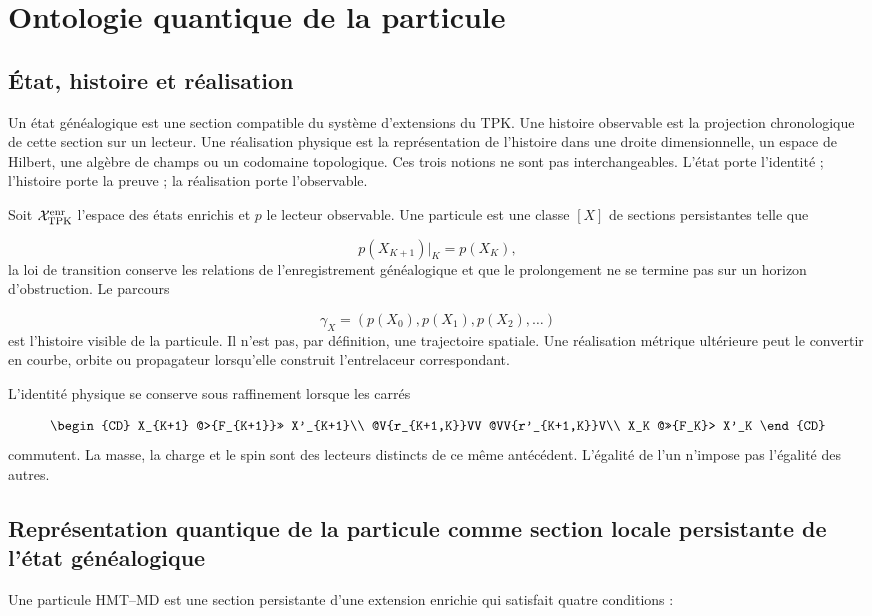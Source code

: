 \section{Ontologie quantique de la particule}
\subsection{État, histoire et réalisation}
Un état généalogique est une section compatible du système d'extensions du TPK. Une histoire observable est la projection chronologique de cette section sur un lecteur. Une réalisation physique est la représentation de l'histoire dans une droite dimensionnelle, un espace de Hilbert, une algèbre de champs ou un codomaine topologique. Ces trois notions ne sont pas interchangeables. L'état porte l'identité ; l'histoire porte la preuve ; la réalisation porte l'observable.

Soit \(\mathcal X_{\rm TPK}^{\rm enr}\) l'espace des états enrichis et \(p\) le lecteur observable. Une particule est une classe \([X]\) de sections persistantes telle que

\[
p(X_{K+1})|_K=p(X_K),
\]
la loi de transition conserve les relations de l'enregistrement généalogique et que le prolongement ne se termine pas sur un horizon d'obstruction. Le parcours

\[
\gamma_X=(p(X_0),p(X_1),p(X_2),\ldots)
\]
est l'histoire visible de la particule. Il n'est pas, par définition, une trajectoire spatiale. Une réalisation métrique ultérieure peut le convertir en courbe, orbite ou propagateur lorsqu'elle construit l'entrelaceur correspondant.

L'identité physique se conserve sous raffinement lorsque les carrés

\[
\begin{CD}
X_{K+1} @>{F_{K+1}}>> X'_{K+1}\\
@V{r_{K+1,K}}VV @VV{r'_{K+1,K}}V\\
X_K @>>{F_K}> X'_K
\end{CD}
\]
commutent. La masse, la charge et le spin sont des lecteurs distincts de ce même antécédent. L'égalité de l'un n'impose pas l'égalité des autres.

\subsection{Représentation quantique de la particule comme section locale persistante de l'état généalogique}
Une particule HMT--MD est une section persistante d'une extension enrichie qui satisfait quatre conditions :

